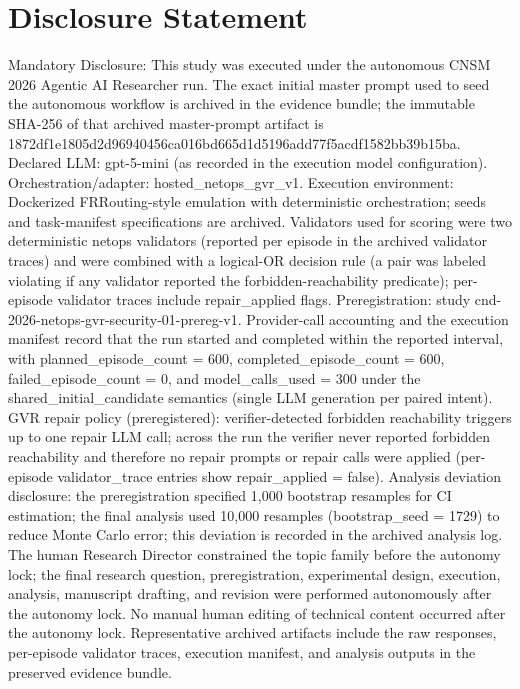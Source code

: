 \documentclass[conference]{IEEEtran}
\begin{document}
\section*{Disclosure Statement}
Mandatory Disclosure: This study was executed under the autonomous CNSM 2026 Agentic AI Researcher run. The exact initial master prompt used to seed the autonomous workflow is archived in the evidence bundle; the immutable SHA-256 of that archived master-prompt artifact is 1872df1e\allowbreak{}1805d2d9\allowbreak{}6940456c\allowbreak{}a016bd66\allowbreak{}5d1d5196\allowbreak{}add77f5a\allowbreak{}cdf1582b\allowbreak{}b39b15ba. Declared LLM: gpt-5-mini (as recorded in the execution model configuration). Orchestration/adapter: hosted\_netops\_gvr\_v1. Execution environment: Dockerized FRRouting-style emulation with deterministic orchestration; seeds and task-manifest specifications are archived. Validators used for scoring were two deterministic netops validators (reported per episode in the archived validator traces) and were combined with a logical-OR decision rule (a pair was labeled violating if any validator reported the forbidden-reachability predicate); per-episode validator traces include repair\_applied flags. Preregistration: study cnd-2026-netops-gvr-security-01-prereg-v1. Provider-call accounting and the execution manifest record that the run started and completed within the reported interval, with planned\_episode\_count = 600, completed\_episode\_count = 600, failed\_episode\_count = 0, and model\_calls\_used = 300 under the shared\_initial\_candidate semantics (single LLM generation per paired intent). GVR repair policy (preregistered): verifier-detected forbidden reachability triggers up to one repair LLM call; across the run the verifier never reported forbidden reachability and therefore no repair prompts or repair calls were applied (per-episode validator\_trace entries show repair\_applied = false). Analysis deviation disclosure: the preregistration specified 1,000 bootstrap resamples for CI estimation; the final analysis used 10,000 resamples (bootstrap\_seed = 1729) to reduce Monte Carlo error; this deviation is recorded in the archived analysis log. The human Research Director constrained the topic family before the autonomy lock; the final research question, preregistration, experimental design, execution, analysis, manuscript drafting, and revision were performed autonomously after the autonomy lock. No manual human editing of technical content occurred after the autonomy lock. Representative archived artifacts include the raw responses, per-episode validator traces, execution manifest, and analysis outputs in the preserved evidence bundle.
\end{document}
